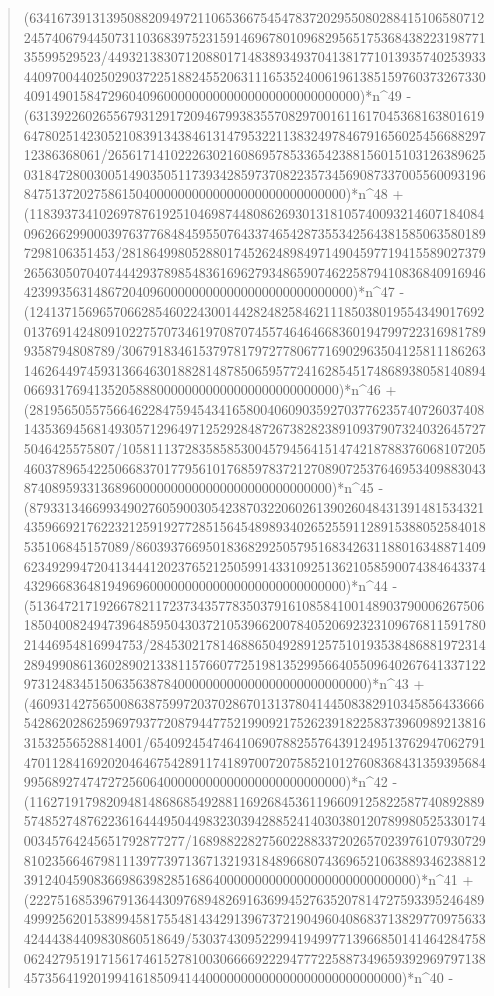 \documentclass[11pt,a4paper]{article}
\theoremstyle{plain}
\theoremstyle{definition}
\begin{document}
\begin{quote}
(6341673913139508820949721106536675454783720295508028841510658071224574067944507311036839752315914696780109682956517536843822319877135599529523/449321383071208801714838934937041381771013935740253933440970044025029037225188245520631116535240061961385159760373267330409149015847296040960000000000000000000000000000)*n\^{}49 - (6313922602655679312917209467993835570829700161161704536816380161964780251423052108391343846131479532211383249784679165602545668829712386368061/2656171410222630216086957853365423881560151031263896250318472800300514903505117393428597370822357345690873370055600931968475137202758615040000000000000000000000000000)*n\^{}48 + (118393734102697876192510469874480862693013181057400932146071840840962662990003976377684845955076433746542873553425643815850635801897298106351453/281864998052880174526248984971490459771941558902737926563050704074442937898548361696279348659074622587941083684091694642399356314867204096000000000000000000000000000)*n\^{}47 - (124137156965706628546022430014428248258462111850380195543490176920137691424809102275707346197087074557464646683601947997223169817899358794808789/3067918346153797817972778067716902963504125811186263146264497459313664630188281487850659577241628545174868938058140894066931769413520588800000000000000000000000000)*n\^{}46 + (281956505575664622847594543416580040609035927037762357407260374081435369456814930571296497125292848726738282389109379073240326457275046425575807/105811137283585853004579456415147421878837606810720546037896542250668370177956101768597837212708907253764695340988304387408959331368960000000000000000000000000000)*n\^{}45 - (87933134669934902760590030542387032206026139026048431391481534321435966921762232125919277285156454898934026525591128915388052584018535106845157089/860393766950183682925057951683426311880163488714096234929947204134441202376521250599143310925136210585900743846433744329668364819496960000000000000000000000000000)*n\^{}44 - (5136472171926678211723734357783503791610858410014890379000626750618504008249473964859504303721053966200784052069232310967681159178021446954816994753/2845302178146886504928912575101935384868819723142894990861360289021338115766077251981352995664055096402676413371229731248345150635638784000000000000000000000000000)*n\^{}43 + (4609314275650086387599720370286701313780414450838291034585643366654286202862596979377208794477521990921752623918225837396098921381631532556528814001/6540924547464106907882557643912495137629470627914701128416920204646754289117418970072075852101276083684313593956849956892747472725606400000000000000000000000000)*n\^{}42 - (1162719179820948148686854928811692684536119660912582258774089288957485274876223616444950449832303942885241403038012078998052533017400345764245651792877277/16898822827560228833720265702397610793072981023566467981113977397136713219318489668074369652106388934623881239124045908366986398285168640000000000000000000000000000)*n\^{}41 + (2227516853967913644309768948269163699452763520781472759339524648949992562015389945817554814342913967372190496040868371382977097563342444384409830860518649/530374309522994194997713966850141464284758062427951917156174615278100306666922294777225887349659392969797138457356419201994161850941440000000000000000000000000000)*n\^{}40 - 
\end{quote}
\end{document}
